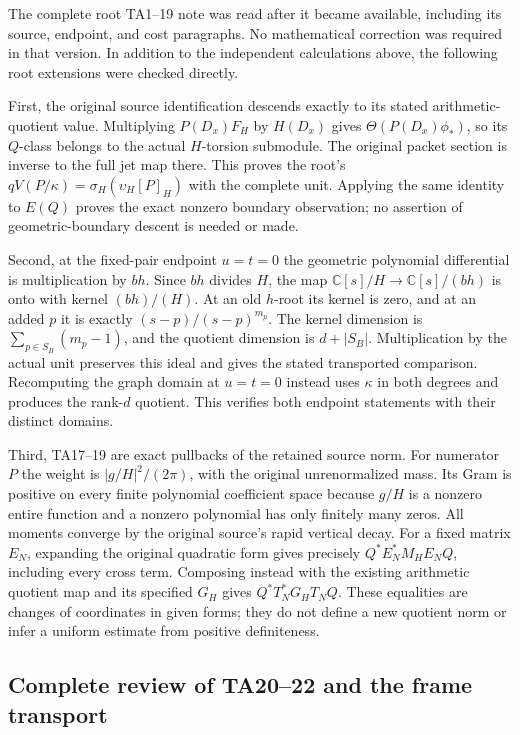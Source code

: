 The complete root TA1--19 note was read after it became available,
including its source, endpoint, and cost paragraphs. No mathematical
correction was required in that version. In addition to the independent
calculations above, the following root extensions were checked directly.


First, the original source identification descends exactly to its stated
arithmetic-quotient value. Multiplying \(P(D_x)F_H\) by \(H(D_x)\) gives
\(\Theta(P(D_x)\phi_*)\), so its \(Q\)-class belongs to the actual \(H\)-torsion
submodule. The original packet section is inverse to the full jet map
there. This proves the root's
\(qV(P/\kappa)=\sigma_H(\upsilon_H[P]_H)\) with the complete unit. Applying
the same identity to \(E(Q)\) proves the exact nonzero boundary observation;
no assertion of geometric-boundary descent is needed or made.


Second, at the fixed-pair endpoint \(u=t=0\) the geometric polynomial
differential is multiplication by \(bh\). Since \(bh\) divides \(H\), the map
\(\mathbb C[s]/H\longrightarrow\mathbb C[s]/(bh)\) is onto with kernel \((bh)/(H)\).
At an old \(h\)-root its kernel is zero, and at an added \(p\) it is exactly
\((s-p)/(s-p)^{m_p}\). The kernel dimension is
\(\sum_{p\in S_B}(m_p-1)\), and the quotient dimension is \(d+|S_B|\).
Multiplication by the actual unit preserves this ideal and gives the
stated transported comparison. Recomputing the graph domain at \(u=t=0\)
instead uses \(\kappa\) in both degrees and produces the rank-\(d\) quotient.
This verifies both endpoint statements with their distinct domains.


Third, TA17--19 are exact pullbacks of the retained source norm.
For numerator \(P\) the weight is \(|g/H|^2/(2\pi)\), with the original
unrenormalized mass. Its Gram is positive on every finite polynomial
coefficient space because \(g/H\) is a nonzero entire function and a
nonzero polynomial has only finitely many zeros. All moments converge
by the original source's rapid vertical decay. For a fixed matrix \(E_N\),
expanding the original quadratic form gives precisely
\(Q^*E_N^*M_HE_NQ\), including every cross term. Composing instead
with the existing arithmetic quotient map and its specified \(G_H\) gives
\(Q^*T_N^*G_HT_NQ\). These equalities are changes of coordinates in
given forms; they do not define a new quotient norm or infer a uniform
estimate from positive definiteness.


\subsection*{Complete review of TA20--22 and the frame transport}


